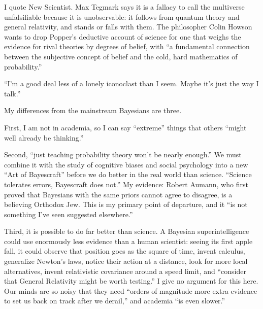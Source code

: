 
I quote New Scientist. Max Tegmark says it is a fallacy to call the multiverse unfalsifiable because it is unobservable: it follows from quantum theory and general relativity, and stands or falls with them. The philosopher Colin Howson wants to drop Popper's deductive account of science for one that weighs the evidence for rival theories by degrees of belief, with ``a fundamental connection between the subjective concept of belief and the cold, hard mathematics of probability.''

``I'm a good deal less of a lonely iconoclast than I seem. Maybe it's just the way I talk.'' 

My differences from the mainstream Bayesians are three. 

First, I am not in academia, so I can say ``extreme'' things that others ``might well already be thinking.''

Second, ``just teaching probability theory won't be nearly enough.'' We must combine it with the study of cognitive biases and social psychology into a new ``Art of Bayescraft'' before we do better in the real world than science. ``Science tolerates errors, Bayescraft does not.'' My evidence: Robert Aumann, who first proved that Bayesians with the same priors cannot agree to disagree, is a believing Orthodox Jew.  This is my primary point of departure, and it ``is not something I've seen suggested elsewhere.'' 

Third, it is possible to do far better than science. A Bayesian superintelligence could use enormously less evidence than a human scientist: seeing its first apple fall, it could observe that position goes as the square of time, invent calculus, generalize Newton's laws, notice their action at a distance, look for more local alternatives, invent relativistic covariance around a speed limit, and ``consider that General Relativity might be worth testing.'' I give no argument for this here.  Our minds are so noisy that they need ``orders of magnitude more extra evidence to set us back on track after we derail,'' and academia ``is even slower.''
